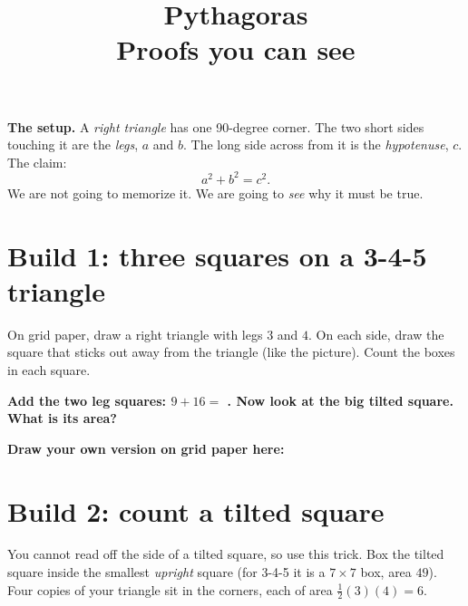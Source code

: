 \documentclass[11pt]{article}
\title{\vspace{-1.5cm}\textbf{Pythagoras}\\[-2pt]
  \large Proofs you can see}
\author{}
\date{}
\newcommand{\drawbox}[1]{%
  \par\vspace{4pt}\noindent
  \fbox{\rule{0pt}{#1}\rule{\dimexpr\linewidth-2\fboxsep-2\fboxrule}{0pt}}%
  \par\vspace{6pt}}
\newcommand{\task}[1]{\par\medskip\noindent\textbf{\color{benblue}#1}\par\nopagebreak}
\begin{document}
\maketitle
\vspace{-1.2cm}

\noindent\textbf{The setup.} A \emph{right triangle} has one 90-degree corner.
The two short sides touching it are the \emph{legs}, $a$ and $b$. The long side
across from it is the \emph{hypotenuse}, $c$. The claim:
\[ a^2 + b^2 = c^2. \]
We are not going to memorize it. We are going to \emph{see} why it must be true.

\section*{Build 1: three squares on a 3-4-5 triangle}
On grid paper, draw a right triangle with legs $3$ and $4$. On each side, draw the
square that sticks out away from the triangle (like the picture). Count the boxes
in each square.

\begin{center}
\end{center}

\task{Add the two leg squares: $9 + 16 = $ \underline{\hspace{1.6cm}}. Now look at
the big tilted square. What is its area? \underline{\hspace{1.6cm}}}

\task{Draw your own version on grid paper here:}
\drawbox{1.4cm}

\section*{Build 2: count a tilted square}
You cannot read off the side of a tilted square, so use this trick. Box the tilted
square inside the smallest \emph{upright} square (for 3-4-5 it is a $7\times 7$
box, area $49$). Four copies of your triangle sit in the corners, each of area
$\frac{1}{2}(3)(4) = 6$.
\end{document}
